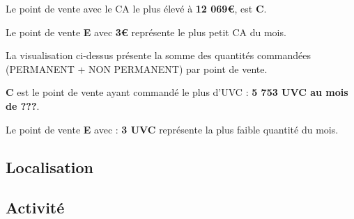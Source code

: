 \documentclass{beamer}
\begin{document}
\begin{frame}
        Le point de vente avec le CA le plus élevé à \textbf{12 069€}, est \textbf{C}.\par
        Le point de vente \textbf{E} avec \textbf{3€} représente le plus petit CA du mois.\par
        La visualisation ci-dessus présente la somme des quantités commandées (PERMANENT + NON PERMANENT) par point de vente.\par
        \textbf{C} est le point de vente ayant commandé le plus d’UVC : \textbf{5 753 UVC au mois de ???}.\par
        Le point de vente \textbf{E} avec : \textbf{3 UVC} représente la plus faible quantité du mois.\par
    \end{frame}

    \subsection{Localisation}
    \subsection{Activité}
\end{document}
